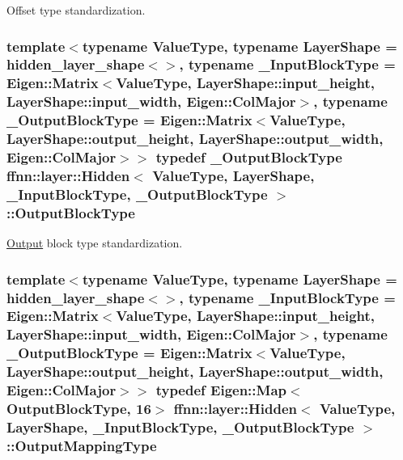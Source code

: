 Offset type standardization. 

\hypertarget{classffnn_1_1layer_1_1_hidden_a9b9e276188ef490ea5301f553225c735}{
\subsubsection[{Output\-Block\-Type}]{\setlength{\rightskip}{0pt plus 5cm}template$<$typename Value\-Type, typename Layer\-Shape = hidden\-\_\-layer\-\_\-shape$<$$>$, typename \-\_\-\-Input\-Block\-Type = Eigen\-::\-Matrix$<$\-Value\-Type, Layer\-Shape\-::input\-\_\-height,  Layer\-Shape\-::input\-\_\-width,  Eigen\-::\-Col\-Major$>$, typename \-\_\-\-Output\-Block\-Type = Eigen\-::\-Matrix$<$\-Value\-Type, Layer\-Shape\-::output\-\_\-height, Layer\-Shape\-::output\-\_\-width, Eigen\-::\-Col\-Major$>$$>$ typedef \-\_\-\-Output\-Block\-Type {\bf ffnn\-::layer\-::\-Hidden}$<$ Value\-Type, Layer\-Shape, \-\_\-\-Input\-Block\-Type, \-\_\-\-Output\-Block\-Type $>$\-::{\bf Output\-Block\-Type}}}\label{classffnn_1_1layer_1_1_hidden_a9b9e276188ef490ea5301f553225c735}


\hyperlink{classffnn_1_1layer_1_1_output}{Output} block type standardization. 

\hypertarget{classffnn_1_1layer_1_1_hidden_a619ae9b0890cb86b66ac2b591b5a5610}{
\subsubsection[{Output\-Mapping\-Type}]{\setlength{\rightskip}{0pt plus 5cm}template$<$typename Value\-Type, typename Layer\-Shape = hidden\-\_\-layer\-\_\-shape$<$$>$, typename \-\_\-\-Input\-Block\-Type = Eigen\-::\-Matrix$<$\-Value\-Type, Layer\-Shape\-::input\-\_\-height,  Layer\-Shape\-::input\-\_\-width,  Eigen\-::\-Col\-Major$>$, typename \-\_\-\-Output\-Block\-Type = Eigen\-::\-Matrix$<$\-Value\-Type, Layer\-Shape\-::output\-\_\-height, Layer\-Shape\-::output\-\_\-width, Eigen\-::\-Col\-Major$>$$>$ typedef Eigen\-::\-Map$<${\bf Output\-Block\-Type}, 16$>$ {\bf ffnn\-::layer\-::\-Hidden}$<$ Value\-Type, Layer\-Shape, \-\_\-\-Input\-Block\-Type, \-\_\-\-Output\-Block\-Type $>$\-::{\bf Output\-Mapping\-Type}}}\label{classffnn_1_1layer_1_1_hidden_a619ae9b0890cb86b66ac2b591b5a5610}


